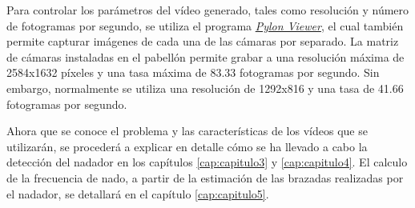 Para controlar los parámetros del vídeo generado, tales como resolución y número de fotogramas por segundo, se utiliza el programa \textit{\href{https://www.baslerweb.com/en/products/basler-pylon-camera-software-suite/pylon-viewer/]}{Pylon Viewer}}, el cual también permite capturar imágenes de cada una de las cámaras por separado. La matriz de cámaras instaladas en el pabellón permite grabar a una resolución máxima de 2584x1632 píxeles y una tasa máxima de 83.33 fotogramas por segundo. Sin embargo, normalmente se utiliza una resolución de 1292x816 y una tasa de 41.66 fotogramas por segundo. 

Ahora que se conoce el problema y las características de los vídeos que se utilizarán, se procederá a explicar en detalle cómo se ha llevado a cabo la detección del nadador en los capítulos \ref{cap:capitulo3} y \ref{cap:capitulo4}. El calculo de la frecuencia de nado, a partir de la estimación de las brazadas realizadas por el nadador, se detallará en el capítulo \ref{cap:capitulo5}.

